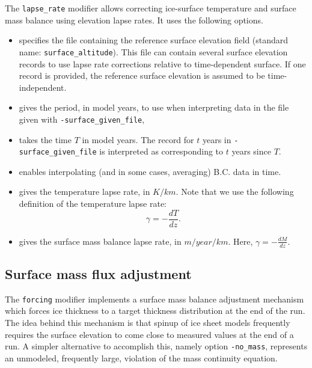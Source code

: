 \documentclass[titlepage,letterpaper,final]{scrartcl}
\begin{document}
The \texttt{lapse_rate} modifier allows correcting ice-surface temperature and
surface mass balance using elevation lapse rates. It uses the following
options.

\begin{itemize}
\item {} specifies the file containing the reference
  surface elevation field (standard name: \texttt{surface_altitude}). This file
  can contain several surface elevation records to use lapse rate corrections
  relative to time-dependent surface. If one record is provided, the reference
  surface elevation is assumed to be time-independent.
\item {} gives the period, in model years, to
  use when interpreting data in the file given with
  \texttt{-surface_given_file},
\item {} takes the time $T$ in model
  years. The record for $t$ years in \texttt{-surface_given_file} is
  interpreted as corresponding to $t$ years since $T$.
\item {} enables interpolating (and in
  some cases, averaging) B.C. data in time.
\item {} gives the temperature lapse rate, in
  $K/km$. Note that we use the following definition of the temperature lapse
  rate:
  \begin{displaymath}
    \gamma = -\frac{dT}{dz}.
  \end{displaymath}
\item {} gives the surface mass balance lapse rate,
  in $m/year/km$. Here, $\gamma=-\frac{dM}{dz}$.
\end{itemize}

\subsection{Surface mass flux adjustment}
\label{sec:smb-adjustment}

The \texttt{forcing} modifier implements a surface mass balance adjustment
mechanism which forces ice thickness to a target thickness distribution at the
end of the run. The idea behind this mechanism is that spinup of ice sheet
models frequently requires the surface elevation to come close to measured
values at the end of a run. A simpler alternative to accomplish this, namely
option \texttt{-no_mass}, represents an unmodeled, frequently large,
violation of the mass continuity equation.
\end{document}
